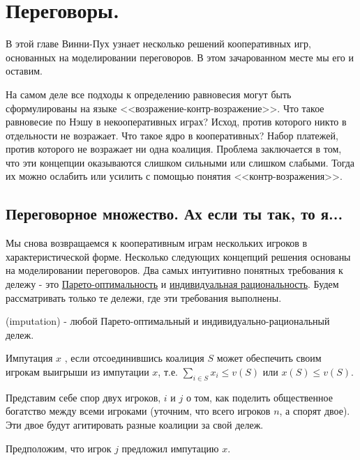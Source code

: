 \section{Переговоры.}

В этой главе Винни-Пух узнает несколько решений кооперативных игр, основанных на моделировании переговоров. В этом зачарованном месте мы его и оставим.

На самом деле все подходы к определению равновесия могут быть сформулированы на языке <<возражение-контр-возражение>>. Что такое равновесие по Нэшу в некооперативных играх? Исход, против которого никто в отдельности не возражает. Что такое ядро в кооперативных? Набор платежей, против которого не возражает ни одна коалиция. Проблема заключается в том, что эти концепции оказываются слишком сильными или слишком слабыми. Тогда их можно ослабить или усилить с помощью понятия <<контр-возражения>>.

\subsection{Переговорное множество. Ах если ты так, то я...}

Мы снова возвращаемся к кооперативным играм нескольких игроков в характеристической форме. Несколько следующих концепций решения основаны на моделировании переговоров. Два самых интуитивно понятных требования к дележу - это \hyperref[Pareto]{Парето-оптимальность} и \hyperref[irationality]{индивидуальная рациональность}. Будем рассматривать только те дележи, где эти требования выполнены.

\begin{mydef}    (imputation) - любой Парето-оптимальный и индивидуально-рациональный дележ.
\end{mydef}

\begin{mydef}
Импутация $x$ , если отсоединившись коалиция $S$ может обеспечить своим игрокам выигрыши из импутации $x$, т.е. $\sum_{i\in S}x_{i}\leq v(S)$ или $x(S)\leq v(S)$.
\end{mydef}

Представим себе спор двух игроков, $i$ и $j$ о том, как поделить общественное богатство между всеми игроками (уточним, что всего игроков $n$, а спорят двое). Эти двое будут агитировать разные коалиции за свой дележ.

Предположим, что игрок $j$ предложил импутацию $x$. 

